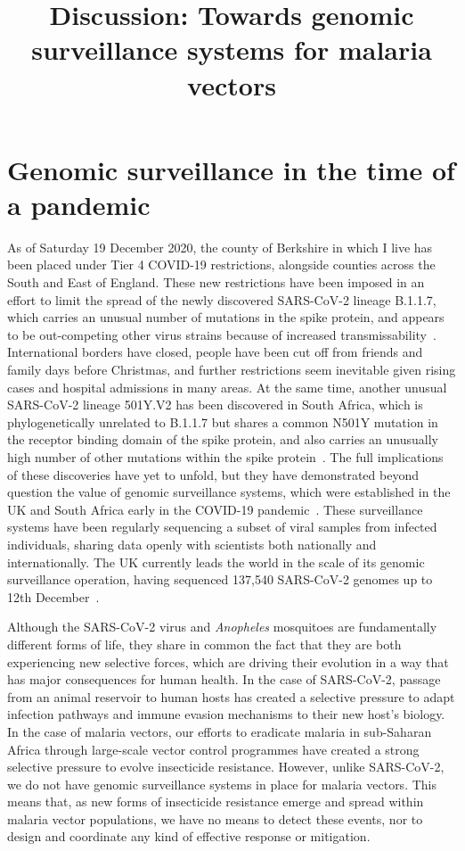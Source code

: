 \documentclass[a4paper,11pt,abstracton,hidelinks]{scrartcl}
\title{
Discussion: Towards genomic surveillance systems for malaria vectors
}
\author{}
\begin{document}
\renewcommand{\abstractname}{Summary}


\maketitle


\section{Genomic surveillance in the time of a pandemic}\label{sec:pandemic}


As of Saturday 19 December 2020, the county of Berkshire in which I live has been placed under Tier 4 COVID-19 restrictions, alongside counties across the South and East of England.
%
These new restrictions have been imposed in an effort to limit the spread of the newly discovered SARS-CoV-2 lineage B.1.1.7, which carries an unusual number of mutations in the spike protein, and appears to be out-competing other virus strains because of increased transmissability~\parencite{Rambaut2020,Davies2020}.
%
International borders have closed, people have been cut off from friends and family days before Christmas, and further restrictions seem inevitable given rising cases and hospital admissions in many areas.
%
At the same time, another unusual SARS-CoV-2 lineage 501Y.V2 has been discovered in South Africa, which is phylogenetically unrelated to B.1.1.7 but shares a common N501Y mutation in the receptor binding domain of the spike protein, and also carries an unusually high number of other mutations within the spike protein~\parencite{Tegally2020}.
%
The full implications of these discoveries have yet to unfold, but they have demonstrated beyond question the value of genomic surveillance systems, which were established in the UK and South Africa early in the COVID-19 pandemic~\parencite{COGUK2020a,Msomi2020}.
%
These surveillance systems have been regularly sequencing a subset of viral samples from infected individuals, sharing data openly with scientists both nationally and internationally.
%
The UK currently leads the world in the scale of its genomic surveillance operation, having sequenced 137,540 SARS-CoV-2 genomes up to 12th December~\parencite{COGUK2020b}.


Although the SARS-CoV-2 virus and \textit{Anopheles} mosquitoes are fundamentally different forms of life, they share in common the fact that they are both experiencing new selective forces, which are driving their evolution in a way that has major consequences for human health.
%
In the case of SARS-CoV-2, passage from an animal reservoir to human hosts has created a selective pressure to adapt infection pathways and immune evasion mechanisms to their new host's biology.
%
In the case of malaria vectors, our efforts to eradicate malaria in sub-Saharan Africa through large-scale vector control programmes have created a strong selective pressure to evolve insecticide resistance.
%
However, unlike SARS-CoV-2, we do not have genomic surveillance systems in place for malaria vectors.
%
This means that, as new forms of insecticide resistance emerge and spread within malaria vector populations, we have no means to detect these events, nor to design and coordinate any kind of effective response or mitigation.
\end{document}
